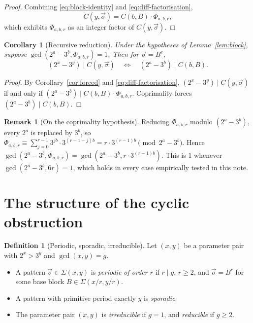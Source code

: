 \documentclass[11pt,a4paper]{article}
\theoremstyle{plain}
\newtheorem{corollary}[theorem]{Corollary}
\theoremstyle{definition}
\newtheorem{remark}[theorem]{Remark}
\newtheorem{definition}[theorem]{Definition}
\begin{document}
\begin{proof}
Combining \eqref{eq:block-identity} and \eqref{eq:diff-factorisation},
\[
C(y, \vec\sigma) = C(b, B) \cdot \Phi_{a, b, r},
\]
which exhibits $\Phi_{a, b, r}$ as an integer factor of $C(y, \vec\sigma)$.
\end{proof}

\begin{corollary}[Recursive reduction]\label{cor:reduction}
Under the hypotheses of Lemma~\ref{lem:block}, suppose
$\gcd(2^a - 3^b, \Phi_{a, b, r}) = 1$. Then for $\vec\sigma = B^r$,
\[
(2^x - 3^y) \mid C(y, \vec\sigma)
\quad \Longleftrightarrow \quad
(2^a - 3^b) \mid C(b, B).
\]
\end{corollary}

\begin{proof}
By Corollary~\ref{cor:forced} and \eqref{eq:diff-factorisation},
$(2^x - 3^y) \mid C(y, \vec\sigma)$ if and only if
$(2^a - 3^b) \mid C(b, B) \cdot \Phi_{a, b, r}$. Coprimality forces
$(2^a - 3^b) \mid C(b, B)$.
\end{proof}

\begin{remark}[On the coprimality hypothesis]
Reducing $\Phi_{a, b, r}$ modulo $(2^a - 3^b)$, every $2^a$ is replaced by $3^b$,
so $\Phi_{a, b, r} \equiv \sum_{j=0}^{r-1} 3^{j b} \cdot 3^{(r-1-j) b}
= r \cdot 3^{(r-1) b} \pmod{2^a - 3^b}$. Hence
$\gcd(2^a - 3^b, \Phi_{a, b, r}) = \gcd(2^a - 3^b, r \cdot 3^{(r-1) b})$.
This is $1$ whenever $\gcd(2^a - 3^b, 6 r) = 1$, which holds in every case
empirically tested in this note.
\end{remark}


\section{The structure of the cyclic obstruction}

\begin{definition}[Periodic, sporadic, irreducible]\label{def:regimes}
Let $(x, y)$ be a parameter pair with $2^x > 3^y$ and $\gcd(x, y) = g$.
\begin{itemize}
\item A pattern $\vec\sigma \in \Sigma(x, y)$ is \emph{periodic of order $r$}
if $r \mid g$, $r \ge 2$, and $\vec\sigma = B^r$ for some base block
$B \in \Sigma(x/r, y/r)$.
\item A pattern with primitive period exactly $y$ is \emph{sporadic}.
\item The parameter pair $(x, y)$ is \emph{irreducible} if $g = 1$, and
\emph{reducible} if $g \ge 2$.
\end{itemize}
\end{definition}
\end{document}
